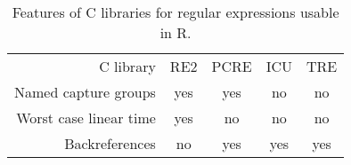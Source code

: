 \begin{table}
  \centering
  \begin{tabular}{r|cccc}
    C library & RE2 & PCRE & ICU & TRE \\
    Named capture groups  & yes & yes & no & no\\
    Worst case linear time & yes & no & no & no \\
    Backreferences & no & yes & yes & yes 
  \end{tabular}
  \caption{\label{tab:regex-libraries}
    Features of C libraries for regular expressions usable in R.
    }
\end{table}



\address{Toby Dylan Hocking\\
  School of Informatics, Computing, and Cyber Systems\\
  Northern Arizona University\\
  Flagstaff, Arizona\\
  USA\\
  }

